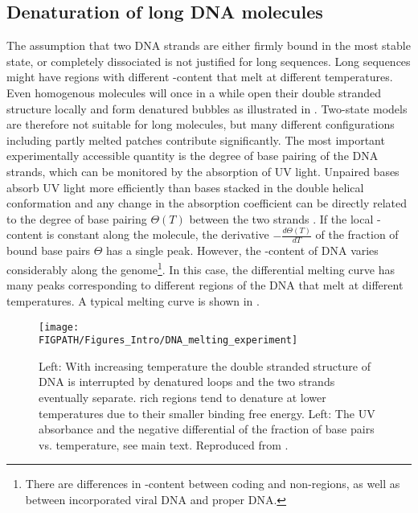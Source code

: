 \subsection{\label{sec:DNA_melting}Denaturation of long DNA molecules}
The assumption that two DNA strands are either firmly bound in the most stable state,
or completely dissociated is not justified for long sequences. Long sequences might have 
regions with different -content that melt at different temperatures. Even 
homogenous molecules will once in a while open their double stranded structure locally and 
form denatured bubbles as illustrated in . Two-state models are therefore not suitable for long molecules, but 
many different configurations  including partly melted patches contribute significantly. The most
important experimentally accessible quantity is the degree of base pairing of the DNA strands, 
which can be monitored 
by the absorption of UV light. Unpaired bases absorb UV light more efficiently than bases 
stacked in the double helical conformation and any change in the absorption coefficient can be
directly related to the degree of base pairing $\Theta(T)$ between the two strands \cite{Wartell_PhysRep_85}. 
If the local -content is constant along the molecule, the derivative 
$-\frac{d \Theta(T)}{d T}$ of the fraction of bound base pairs $\Theta$ 
has a single peak. However, the -content of DNA varies considerably along the genome\footnote{
There are differences in -content between coding and non-regions, 
as well as between incorporated viral DNA and proper DNA.}. 
In this case, the differential melting curve has many peaks corresponding to
different regions of the DNA that melt at different temperatures. A typical melting curve is shown 
in .
\begin{figure}
\centering
  \texttt{[image: \\FIGPATH/Figures\_Intro/DNA\_melting\_experiment]}
\caption[DNA melting curve.]{
\label{fig:DNA_melting_experiment} 
Left: With increasing temperature the double stranded structure of DNA is interrupted by 
denatured loops and the two strands eventually separate.  rich regions tend to denature
at lower temperatures due to their smaller binding free energy. Left: The UV absorbance and the negative 
differential of the fraction of base pairs vs. temperature, see main text.
Reproduced from \cite{Wartell_PhysRep_85}.}
\end{figure}

